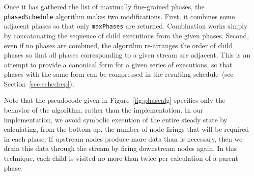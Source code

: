 Once it has gathered the list of maximally fine-grained phases, the
{\tt phasedSchedule} algorithm makes two modifications.  First, it
combines some adjacent phases so that only {\tt maxPhases} are
returned.  Combination works simply by concatanating the sequence of
child executions from the given phases.  Second, even if no phases are
combined, the algorithm re-arranges the order of child phases so that
all phases corresponding to a given stream are adjacent.  This is an
attempt to provide a canonical form for a given series of executions,
so that phases with the same form can be compressed in the resulting
schedule~(see Section~\ref{sec:schedrep}).

Note that the pseudocode given in Figure~\ref{fig:phasealg} specifies only
the behavior of the algorithm, rather than the implementation.  In our
implementation, we avoid symbolic execution of the entire steady state
by calculating, from the bottom-up, the number of node firings that
will be required in each phase.  If upstream nodes produce more data
than is necessary, then we drain this data through the stream by
firing downstream nodes again.  In this technique, each child is
visited no more than twice per calculation of a parent phase.

